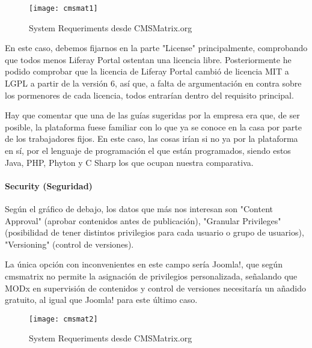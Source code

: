 \begin{figure}
\begin{narrow}{-0.2\linewidth}{-0.2\linewidth}
\centering
\texttt{[image: cmsmat1]}
\caption{System Requeriments desde CMSMatrix.org}
\end{narrow}
\label{fig:cmsmat1}
\end{figure}

\par En este caso, debemos fijarnos en la parte "License" principalmente, comprobando que todos menos Liferay Portal ostentan una licencia libre. Posteriormente he podido comprobar que la licencia de Liferay Portal cambió de licencia MIT a LGPL a partir de la versión 6\cite{references:liferaylicense}, así que, a falta de argumentación en contra sobre los pormenores de cada licencia, todos entrarían dentro del requisito principal.

\par Hay que comentar que una de las guías sugeridas por la empresa era que, de ser posible, la plataforma fuese familiar con lo que ya se conoce en la casa por parte de los trabajadores fijos. En este caso, las cosas irían si no ya por la plataforma en sí, por el lenguaje de programación el que están programados, siendo estos Java, PHP, Phyton y C Sharp los que ocupan nuestra comparativa.

\paragraph{Security (Seguridad)}

\par Según el gráfico de debajo, los datos que más nos interesan son "Content Approval" (aprobar contenidos antes de publicación), "Granular Privileges" (posibilidad de tener distintos privilegios para cada usuario o grupo de usuarios), "Versioning" (control de versiones).

\par La única opción con inconvenientes en este campo sería Joomla!, que según cmsmatrix no permite la asignación de privilegios personalizada, señalando que MODx en supervisión de contenidos y control de versiones necesitaría un añadido gratuito, al igual que Joomla! para este último caso.

\begin{figure}
\begin{narrow}{-0.2\linewidth}{-0.2\linewidth}
\centering
\texttt{[image: cmsmat2]}
\caption{System Requeriments desde CMSMatrix.org}
\end{narrow}
\label{fig:cmsmat1}
\end{figure}


